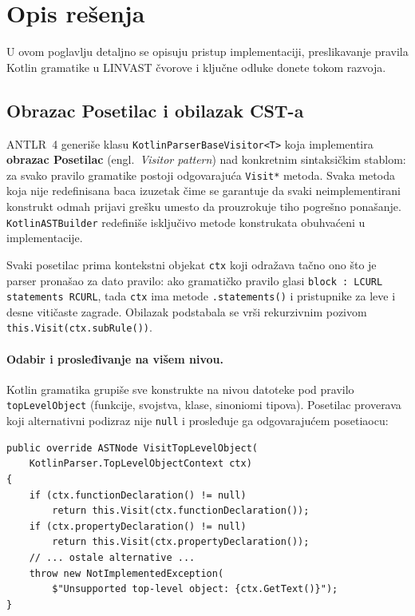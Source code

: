 \documentclass[a4paper]{article}
\begin{document}
\section{Opis rešenja}

U ovom poglavlju detaljno se opisuju pristup implementaciji, preslikavanje
pravila Kotlin gramatike u LINVAST čvorove i ključne odluke donete tokom razvoja.

\subsection{Obrazac Posetilac i obilazak CST-a}
ANTLR~4 generiše klasu \texttt{KotlinParserBaseVisitor<T>} koja implementira
\textbf{obrazac Posetilac} (engl.\ \emph{Visitor pattern}) nad konkretnim
sintaksičkim stablom: za svako pravilo gramatike postoji odgovarajuća
\texttt{Visit*} metoda. Svaka metoda koja nije redefinisana baca izuzetak
čime se garantuje da svaki neimplementirani konstrukt odmah prijavi grešku
umesto da prouzrokuje tiho pogrešno ponašanje.
\texttt{KotlinASTBuilder} redefiniše isključivo metode konstrukata obuhvaćeni u implementacije.

\vspace{2px}
Svaki posetilac prima kontekstni objekat \texttt{ctx} koji odražava tačno
ono što je parser pronašao za dato pravilo: ako gramatičko pravilo glasi
\texttt{block : LCURL statements RCURL}, tada \texttt{ctx} ima metode
\texttt{.statements()} i pristupnike za leve i desne vitičaste zagrade.
Obilazak podstabala se vrši rekurzivnim pozivom \texttt{this.Visit(ctx.subRule())}.

\paragraph{Odabir i prosleđivanje na višem nivou.}
Kotlin gramatika grupiše sve konstrukte na nivou datoteke pod pravilo
\texttt{topLevelObject} (funkcije, svojstva, klase, sinoniomi tipova).
Posetilac proverava koji alternativni podizraz nije \texttt{null} i prosleđuje
ga odgovarajućem posetiaocu:

\begin{lstlisting}[language=CSharp, caption={Odabir vrste konstrukta na nivou datoteke}]
public override ASTNode VisitTopLevelObject(
    KotlinParser.TopLevelObjectContext ctx)
{
    if (ctx.functionDeclaration() != null)
        return this.Visit(ctx.functionDeclaration());
    if (ctx.propertyDeclaration() != null)
        return this.Visit(ctx.propertyDeclaration());
    // ... ostale alternative ...
    throw new NotImplementedException(
        $"Unsupported top-level object: {ctx.GetText()}");
}
\end{lstlisting}
\end{document}
